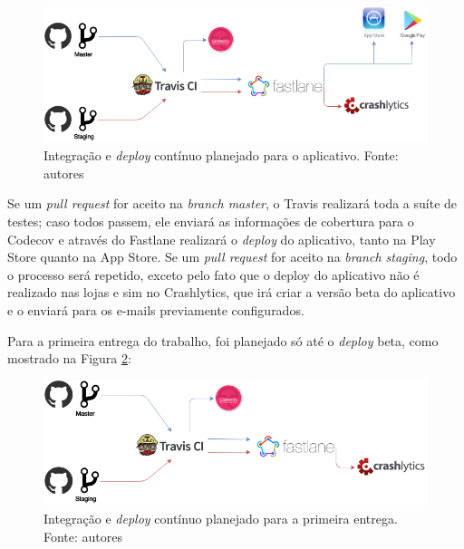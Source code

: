 \begin{figure}[H]
    \centering
    \includegraphics[scale=0.5]{figuras/ci_should_be.png}
    \caption[Integração e \textit{deploy} contínuo planejado para o aplicativo]{Integração e \textit{deploy} contínuo planejado para o aplicativo. Fonte: autores}
    \label{img:integracao_deploy_continuo_planejado_app}
\end{figure}

Se um \textit{pull request} for aceito na \textit{branch master}, o Travis realizará toda a suíte de testes; caso todos passem, ele enviará as informações de cobertura para o Codecov e através do Fastlane realizará o \textit{deploy} do aplicativo, tanto na Play Store quanto na App Store. Se um \textit{pull request} for aceito na \textit{branch staging}, todo o processo será repetido, exceto pelo fato que o deploy do aplicativo não é realizado nas lojas e sim no Crashlytics, que irá criar a versão beta do aplicativo e o enviará para os e-mails previamente configurados.

Para a primeira entrega do trabalho, foi planejado só até o \textit{deploy} beta, como mostrado na Figura \ref{img:integracao_deploy_continuo_planejado_primeira_entrega}:

\begin{figure}[H]
    \centering
    \includegraphics[scale=0.5]{figuras/ci_as_is.png}
    \caption[Integração e \textit{deploy} contínuo planejado para a primeira entrega]{Integração e \textit{deploy} contínuo planejado para a primeira entrega. Fonte: autores}
    \label{img:integracao_deploy_continuo_planejado_primeira_entrega}
\end{figure}


